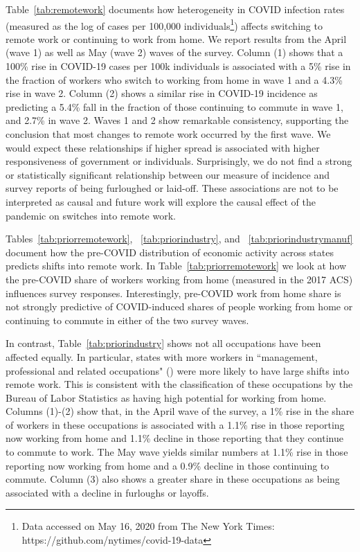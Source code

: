 \documentclass[12pt]{article}
\begin{document}
Table~\ref{tab:remotework} documents how heterogeneity in COVID infection rates (measured as the log of cases per 100,000 individuals\footnote{Data accessed on May 16, 2020 from The New York Times: https://github.com/nytimes/covid-19-data}) affects switching to remote work or continuing to work from home. We report results from the April (wave 1) as well as May (wave 2) waves of the survey. Column (1) shows that a 100\% rise in COVID-19 cases per 100k individuals is associated with a 5\% rise in the fraction of workers who switch to working from home in wave 1 and a 4.3\% rise in wave 2. Column (2) shows a similar rise in COVID-19 incidence as predicting a 5.4\% fall in the fraction of those continuing to commute in wave 1, and 2.7\% in wave 2. Waves 1 and 2 show remarkable consistency, supporting the conclusion that most changes to remote work occurred by the first wave. We would expect these relationships if higher spread is associated with higher responsiveness of government or individuals. Surprisingly, we do not find a strong or statistically significant relationship between our measure of incidence and survey reports of being furloughed or laid-off. These associations are not to be interpreted as causal and future work will explore the causal effect of the pandemic on switches into remote work.



Tables~\ref{tab:priorremotework}, ~\ref{tab:priorindustry}, and ~\ref{tab:priorindustrymanuf} document how the pre-COVID distribution of economic activity across states predicts shifts into remote work. In Table~\ref{tab:priorremotework} we look at how the pre-COVID share of workers working from home (measured in the 2017 ACS) influences survey responses.  Interestingly, pre-COVID work from home share is not strongly predictive of COVID-induced shares of people working from home or continuing to commute in either of the two survey waves. 



In contrast, Table~\ref{tab:priorindustry} shows not all occupations have been affected equally.  In particular, states with more workers in ``management, professional and related occupations" (\cite{krantz2019did}) were more likely to have large shifts into remote work. This is consistent with the classification of these occupations by the Bureau of Labor Statistics as having high potential for working from home. Columns (1)-(2) show that, in the April wave of the survey, a 1\% rise in the share of workers in these occupations is associated with a 1.1\% rise in those reporting now working from home and 1.1\% decline in those reporting that they continue to commute to work. The May wave yields similar numbers at 1.1\% rise in those reporting now working from home and a 0.9\% decline in those continuing to commute. Column (3) also shows a greater share in these occupations as being associated with a decline in furloughs or layoffs. 
\end{document}
